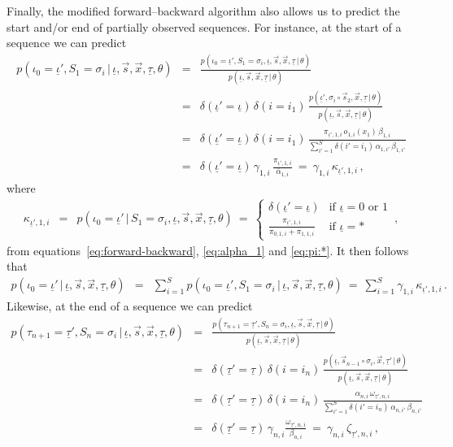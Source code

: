 \documentclass[a4paper]{article}
\newcommand{\ui}{\underline{\iota}}
\newcommand{\ut}{\underline{\tau}}
\begin{document}
Finally, the modified forward--backward algorithm also allows us to predict the start and/or end of partially observed sequences.
For instance, at the start of a sequence we can predict
\begin{eqnarray}
    p(\iota_0\!=\!\ui',S_1\!=\!\sigma_i\,|\,\ui,\vec{s},\vec{x},\ut,\theta) 
& = &
   \frac{p(\iota_0\!=\!\ui',S_1\!=\!\sigma_i,\ui,\vec{s},\vec{x},\ut\,|\,\theta) }
           {p(\ui,\vec{s},\vec{x},\ut\,|\,\theta) }
\nonumber\\& = &
   \delta(\ui'\!=\!\ui)\,\delta(i\!=\!i_1)\,
\frac{p(\ui',\sigma_i\circ\vec{s}_2,\vec{x},\ut\,|\,\theta) }
           {p(\ui,\vec{s},\vec{x},\ut\,|\,\theta) }
\nonumber\\& = &
   \delta(\ui'\!=\!\ui)\,\delta(i\!=\!i_1)\,
\frac{\pi_{\ui',1,i}\,o_{1,i}(x_1)\,\beta_{1,i}}
{\sum_{i'=1}^S\delta(i'\!=\!i_1)\,\alpha_{1,i'}\,\beta_{1,i'}}
\nonumber\\& = &
\delta(\ui'\!=\!\ui)\,\gamma_{1,i}\,\frac{\pi_{\ui',1,i}}{\bar{\alpha}_{1,i}}~=~
\gamma_{1,i}\,\kappa_{\ui',1,i}
\,,
\label{eq:p_i0_s1_g_v}
\end{eqnarray}
where
\begin{eqnarray}
   \kappa_{\ui',1,i} & = &
    p(\iota_0\!=\!\ui'\,|\,S_1\!=\!\sigma_i,\ui,\vec{s},\vec{x},\ut,\theta) 
~=~\left\{\begin{array}{ll}
  \delta(\ui'\!=\!\ui) & \mbox{if }\ui=0 \mbox{ or } 1
\\
  \frac{\pi_{\ui',1,i}}{\pi_{0,1,i}+\pi_{1,1,i}} & \mbox{if }\ui=*
\end{array}\right.\,,
\end{eqnarray}
from equations~\eqref{eq:forward-backward}, \eqref{eq:alpha_1} and \eqref{eq:pi:*}. 
It then follows that
\begin{eqnarray}
    p(\iota_0\!=\!\ui'\,|\,\ui,\vec{s},\vec{x},\ut,\theta) 
& = &
\sum_{i=1}^S
    p(\iota_0\!=\!\ui',S_1\!=\!\sigma_i\,|\,\ui,\vec{s},\vec{x},\ut,\theta) 
~=~\sum_{i=1}^S\gamma_{1,i}\,\kappa_{\ui',1,i}
\,.
\end{eqnarray}
Likewise, at the end of a sequence we can predict
\begin{eqnarray}
    p(\tau_{n+1}\!=\!\ut',S_n\!=\!\sigma_i\,|\,\ui,\vec{s},\vec{x},\ut,\theta) 
& = &
   \frac{p(\tau_{n+1}\!=\!\ut',S_n\!=\!\sigma_i,\ui,\vec{s},\vec{x},\ut\,|\,\theta) }
           {p(\ui,\vec{s},\vec{x},\ut\,|\,\theta) }
\nonumber\\& = &
\delta(\ut'\!=\!\ut)\,\delta(i\!=\!i_n)\,
\frac{p(\ui,\vec{s}_{n-1}\circ\sigma_i,\vec{x},\ut'\,|\,\theta) }
       {p(\ui,\vec{s},\vec{x},\ut\,|\,\theta) }
\nonumber\\& = &
\delta(\ut'\!=\!\ut)\,\delta(i\!=\!i_n)\,
\frac{\alpha_{n,i}\,\omega_{\ut',n,i}}
{\sum_{i'=1}^S\delta(i'\!=\!i_n)\,\alpha_{n,i'}\,\beta_{n,i'}}
\nonumber\\& = &
\delta(\ut'\!=\!\ut)\,\gamma_{n,i}\frac{\omega_{\ut',n,i}}{\beta_{n,i}}
~=~\gamma_{n,i}\,\zeta_{\ut',n,i}
\,,
\label{eq:p_tnp1_sn_g_v}
\end{eqnarray}
\end{document}
